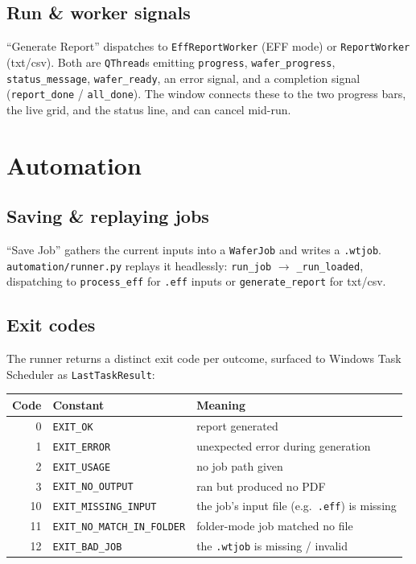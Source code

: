\documentclass[11pt,a4paper]{report}
\newcommand{\code}[1]{\texttt{#1}}
\begin{document}
\section{Run \& worker signals}
``Generate Report'' dispatches to \code{EffReportWorker} (EFF mode) or
\code{ReportWorker} (txt/csv). Both are \code{QThread}s emitting
\code{progress}, \code{wafer\_progress}, \code{status\_message},
\code{wafer\_ready}, an error signal, and a completion signal
(\code{report\_done} / \code{all\_done}). The window connects these to the two
progress bars, the live grid, and the status line, and can cancel mid-run.

\chapter{Automation}\label{ch:auto}

\section{Saving \& replaying jobs}
``Save Job'' gathers the current inputs into a \code{WaferJob} and writes a
\code{.wtjob}. \code{automation/runner.py} replays it headlessly:
\code{run\_job} $\to$ \code{\_run\_loaded}, dispatching to \code{process\_eff}
for \code{.eff} inputs or \code{generate\_report} for txt/csv.

\section{Exit codes}
The runner returns a distinct exit code per outcome, surfaced to Windows Task
Scheduler as \code{LastTaskResult}:

\begin{longtable}{@{}rp{4.2cm}p{7.6cm}@{}}
\toprule
\textbf{Code} & \textbf{Constant} & \textbf{Meaning}\\
\midrule
\endhead
0  & \code{EXIT\_OK} & report generated\\
1  & \code{EXIT\_ERROR} & unexpected error during generation\\
2  & \code{EXIT\_USAGE} & no job path given\\
3  & \code{EXIT\_NO\_OUTPUT} & ran but produced no PDF\\
10 & \code{EXIT\_MISSING\_INPUT} & the job's input file (e.g.\ \code{.eff}) is missing\\
11 & \code{EXIT\_NO\_MATCH\_IN\_FOLDER} & folder-mode job matched no file\\
12 & \code{EXIT\_BAD\_JOB} & the \code{.wtjob} is missing / invalid\\
\bottomrule
\end{longtable}
\end{document}
